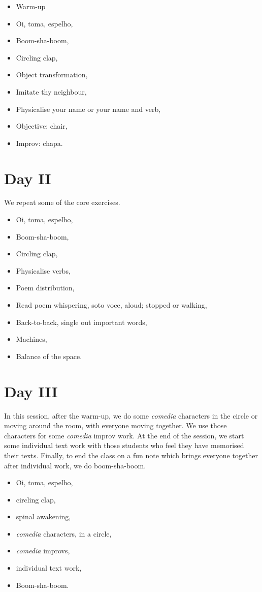 \documentclass[article,twocolumn,twoside]{memoir}
\begin{document}
\begin{itemize}
\item Warm-up
\item Oi, toma, espelho,
\item Boom-sha-boom,
\item Circling clap,
\item Object transformation,
\item Imitate thy neighbour,
\item Physicalise your name or your name and verb,
\item Objective: chair,
\item Improv: chapa.
\end{itemize}
\section{Day II}

We repeat some of the core exercises.

\begin{itemize}
\item Oi, toma, espelho,
\item Boom-sha-boom,
\item Circling clap,
\item Physicalise verbs,
\item Poem distribution,
\item Read poem whispering, soto voce, aloud; stopped or walking,
\item Back-to-back, single out important words,
\item Machines,
\item Balance of the space.
\end{itemize}
\section{Day III}
In this session, after the warm-up, we do some \textit{comedia} characters in
the circle or moving around the room, with everyone moving together. We use
those characters for some \textit{comedia} improv work. At the end of the
session, we start some individual text work with those students who feel they
have memorised their texts. Finally, to end the class on a fun note which
brings everyone together after individual work, we do boom-sha-boom.

\begin{itemize}
\item Oi, toma, espelho,
\item circling clap,
\item spinal awakening,
\item \textit{comedia} characters, in a circle,
\item \textit{comedia} improvs,
\item individual text work,
\item Boom-sha-boom.
\end{itemize}
\end{document}
